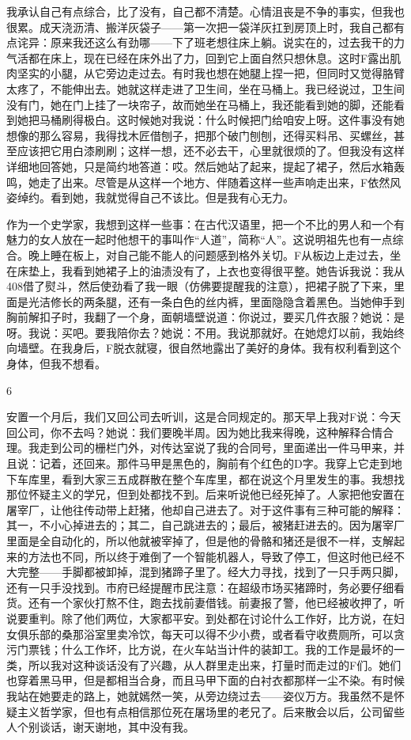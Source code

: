 我承认自己有点综合，比了没有，自己都不清楚。心情沮丧是不争的事实，但我也很累。成天浇沥清、搬洋灰袋子——第一次把一袋洋灰扛到房顶上时，我自己都有点诧异：原来我还这么有劲哪——下了班老想往床上躺。说实在的，过去我干的力气活都在床上，现在已经在床外出了力，回到它上面自然只想休息。这时F露出肌肉坚实的小腿，从它旁边走过去。有时我也想在她腿上捏一把，但同时又觉得胳臂太疼了，不能伸出去。她就这样走进了卫生间，坐在马桶上。我已经说过，卫生间没有门，她在门上挂了一块帘子，故而她坐在马桶上，我还能看到她的脚，还能看到她把马桶刷得极白。这时候她对我说：什么时候把门给咱安上呀。这件事没有她想像的那么容易，我得找木匠借刨子，把那个破门刨刨，还得买料吊、买螺丝，甚至应该把它用白漆刷刷；这样一想，还不必去干，心里就很烦的了。但我没有这样详细地回答她，只是简约地答道：哎。然后她站了起来，提起了裙子，然后水箱轰鸣，她走了出来。尽管是从这样一个地方、伴随着这样一些声响走出来，F依然风姿绰约。看到她，我就觉得自己不该比。但是我有心无力。 

作为一个史学家，我想到这样一些事：在古代汉语里，把一个不比的男人和一个有魅力的女人放在一起时他想干的事叫作“人道”，简称“人”。这说明祖先也有一点综合。晚上睡在板上，对自己能不能人的问题感到格外关切。F从板边上走过去，坐在床垫上，我看到她裙子上的油渍没有了，上衣也变得很平整。她告诉我说：我从408借了熨斗，然后使劲看了我一眼（仿佛要提醒我的注意），把裙子脱了下来，里面是光洁修长的两条腿，还有一条白色的丝内裤，里面隐隐含着黑色。当她伸手到胸前解扣子时，我翻了一个身，面朝墙壁说道：你说过，要买几件衣服？她说：是呀。我说：买吧。要我陪你去？她说：不用。我说那就好。在她熄灯以前，我始终向墙壁。在我身后，F脱衣就寝，很自然地露出了美好的身体。我有权利看到这个身体，但我不想看。 

6 

安置一个月后，我们又回公司去听训，这是合同规定的。那天早上我对F说：今天回公司，你不去吗？她说：我们要晚半周。因为她比我来得晚，这种解释合情合理。我走到公司的栅栏门外，对传达室说了我的合同号，里面递出一件马甲来，并且说：记着，还回来。那件马甲是黑色的，胸前有个红色的D字。我穿上它走到地下车库里，看到大家三五成群散在整个车库里，都在说这个月里发生的事。我想找那位怀疑主义的学兄，但到处都找不到。后来听说他已经死掉了。人家把他安置在屠宰厂，让他往传动带上赶猪，他却自己进去了。对于这件事有三种可能的解释：其一，不小心掉进去的；其二，自己跳进去的；最后，被猪赶进去的。因为屠宰厂里面是全自动化的，所以他就被宰掉了，但是他的骨骼和猪还是很不一样，支解起来的方法也不同，所以终于难倒了一个智能机器人，导致了停工，但这时他已经不大完整——手脚都被卸掉，混到猪蹄子里了。经大力寻找，找到了一只手两只脚，还有一只手没找到。市府已经提醒市民注意：在超级市场买猪蹄时，务必要仔细看货。还有一个家伙打熬不住，跑去找前妻借钱。前妻报了警，他已经被收押了，听说要重判。除了他们两位，大家都平安。到处都在讨论什么工作好，比方说，在妇女俱乐部的桑那浴室里卖冷饮，每天可以得不少小费，或者看守收费厕所，可以贪污门票钱；什么工作坏，比方说，在火车站当计件的装卸工。我的工作是最坏的一类，所以我对这种谈话没有了兴趣，从人群里走出来，打量时而走过的F们。她们也穿着黑马甲，但是都相当合身，而且马甲下面的白衬衣都那样一尘不染。有时候我站在她要走的路上，她就嫣然一笑，从旁边绕过去——姿仪万方。我虽然不是怀疑主义哲学家，但也有点相信那位死在屠场里的老兄了。后来散会以后，公司留些人个别谈话，谢天谢地，其中没有我。 


